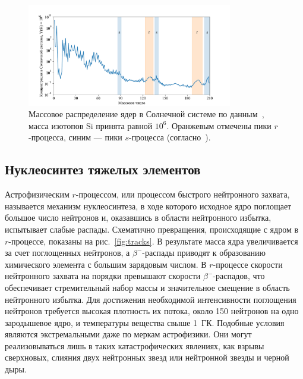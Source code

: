 \begin{figure}[!b]
  \centering
  \includegraphics[width=0.8\textwidth]{../pics/lodders.pdf}
  \caption{Массовое распределение ядер в Солнечной системе по данным~\cite{lodders2003}, масса изотопов Si принята равной $10^6$. Оранжевым отмечены пики $r$-процесса, синим --- пики $s$-процесса (согласно~\cite{cowan2021}).}
  \label{fig:lodders_vs_ame}
\end{figure}

\subsection{Нуклеосинтез тяжелых элементов}
Астрофизическим $r$-процессом, или процессом быстрого нейтронного захвата, называется механизм нуклеосинтеза, в ходе которого исходное ядро поглощает большое число нейтронов и, оказавшись в области нейтронного избытка, испытывает слабые распады. Схематично превращения, происходящие с ядром в $r$-процессе, показаны на рис.~\ref{fig:tracks}. В результате масса ядра увеличивается за счет поглощенных нейтронов, а $\beta^-$-распады приводят к образованию химического элемента с большим зарядовым числом. В $r$-процессе скорости нейтронного захвата на порядки превышают скорости $\beta^-$-распадов, что обеспечивает стремительный набор массы и значительное смещение в область нейтронного избытка. Для достижения необходимой интенсивности поглощения нейтронов требуется высокая плотность их потока, около 150 нейтронов на одно зародышевое ядро, и температуры вещества свыше 1~ГК. Подобные условия являются экстремальными даже по меркам астрофизики. Они могут реализовываться лишь в таких катастрофических явлениях, как взрывы сверхновых, слияния двух нейтронных звезд или нейтронной звезды и черной дыры.

